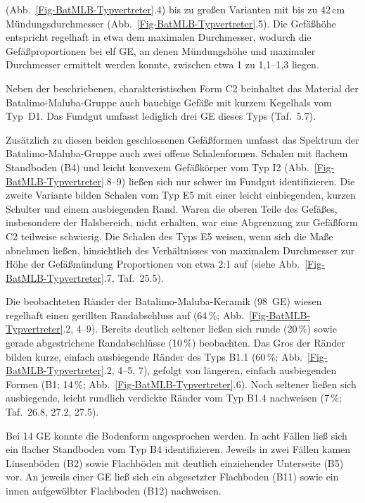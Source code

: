 (Abb.~\ref{Fig-BatMLB-Typvertreter}.4) bis zu großen Varianten mit bis zu 42\,cm Mündungsdurchmesser (Abb.~\ref{Fig-BatMLB-Typvertreter}.5). Die Gefäßhöhe entspricht regelhaft in etwa dem maximalen Durchmesser, wodurch die Gefäßproportionen bei elf GE, an denen Mündungshöhe und maximaler Durchmesser ermittelt werden konnte, zwischen etwa 1 zu 1,1--1,3 liegen.

Neben der beschriebenen, charakteristischen Form C2 beinhaltet das Material der Batalimo-Maluba-Gruppe auch bauchige Gefäße mit kurzem Kegelhals vom Typ~D1. Das Fundgut umfasst lediglich drei GE dieses Typs (Taf.~5.7).

Zusätzlich zu diesen beiden geschlossenen Gefäßformen umfasst das Spektrum der Batalimo-Maluba-Gruppe auch zwei offene Schalenformen. Schalen mit flachem Standboden (B4) und leicht konvexem Gefäßkörper vom Typ I2 (Abb.~\ref{Fig-BatMLB-Typvertreter}.8--9) ließen sich nur schwer im Fundgut identifizieren. Die zweite Variante bilden Schalen vom Typ E5 mit einer leicht einbiegenden, kurzen Schulter und einem ausbiegenden Rand. Waren die oberen Teile des Gefäßes, insbesondere der Halsbereich, nicht erhalten, war eine Abgrenzung zur Gefäßform C2 teilweise schwierig. Die Schalen des Typs E5 weisen, wenn sich die Maße abnehmen ließen, hinsichtlich des Verhältnisses von maximalem Durchmesser zur Höhe der Gefäßmündung Proportionen von etwa 2:1 auf (siehe Abb.~\ref{Fig-BatMLB-Typvertreter}.7, Taf.~25.5).

Die beobachteten Ränder der Batalimo-Maluba-Keramik (98~GE) wiesen regelhaft einen gerillten Randabschluss auf (64\,\%; Abb.~\ref{Fig-BatMLB-Typvertreter}.2, 4--9). Bereits deutlich seltener ließen sich runde (20\,\%) sowie gerade abgestrichene Randabschlüsse (10\,\%) beobachten. Das Gros der Ränder bilden kurze, einfach ausbiegende Ränder des Typs B1.1 (60\,\%; Abb.~\ref{Fig-BatMLB-Typvertreter}.2, 4--5, 7), gefolgt von längeren, einfach ausbiegenden Formen (B1; 14\,\%; Abb.~\ref{Fig-BatMLB-Typvertreter}.6). Noch seltener ließen sich ausbiegende, leicht rundlich verdickte Ränder vom Typ B1.4 nachweisen (7\,\%; Taf.~26.8, 27.2, 27.5). 

Bei 14 GE konnte die Bodenform angesprochen werden. In acht Fällen ließ sich ein flacher Standboden vom Typ B4 identifizieren. Jeweils in zwei Fällen kamen Linsenböden (B2) sowie Flachböden mit deutlich einziehender Unterseite (B5) vor. An jeweils einer GE ließ sich ein abgesetzter Flachboden (B11) sowie ein innen aufgewölbter Flachboden (B12) nachweisen.

